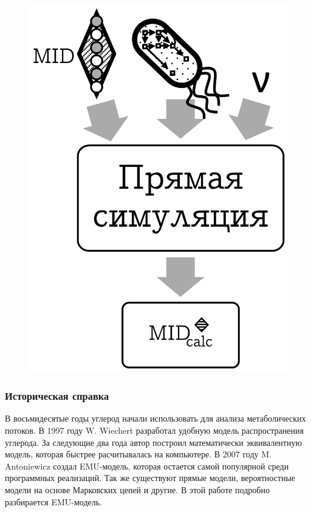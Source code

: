 \documentclass[14pt, a4paper]{extreport}
\begin{document}
\begin{multicols}{2}[]
	\begin{figure}[H]
		\includegraphics[width=0.9\linewidth]{direct_simulation.png}
		\label{direct_simulation}
	\end{figure}
	\subsubsection{Историческая справка}
	В восьмидесятые годы углерод начали использовать для анализа метаболических потоков. В 1997 году	
	W. Wiechert разработал удобную модель распространения углерода. За следующие два года автор построил математически эквивалентную модель, которая быстрее расчитывалась на компьютере. В 2007 году M. Antoniewicz создал EMU-модель, которая остается самой популярной среди программных реализаций. Так же существуют прямые модели\cite{Direct_MFA}, вероятностные модели на основе Марковских цепей\cite{Markov_chain_MFA} и другие\cite{Fluxomer_MFA}. В этой работе подробно разбирается EMU-модель.
\end{multicols}
\end{document}
